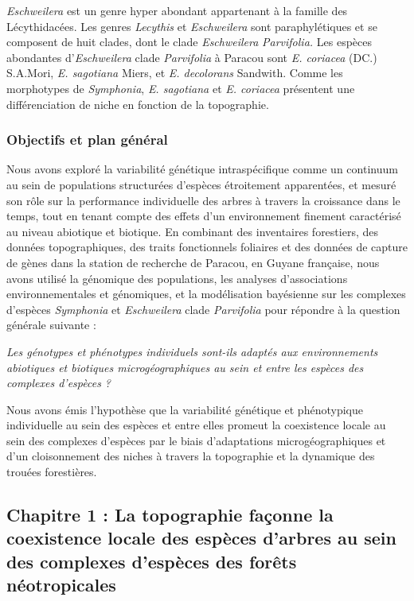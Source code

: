 \documentclass[12pt,twoside,a4paper, a]{article}
\begin{document}
\emph{Eschweilera} est un genre hyper abondant appartenant à la famille des Lécythidacées. Les genres \emph{Lecythis} et \emph{Eschweilera} sont paraphylétiques et se composent de huit clades, dont le clade \emph{Eschweilera} \emph{Parvifolia.} Les espèces abondantes d'\emph{Eschweilera} clade \emph{Parvifolia} à Paracou sont \emph{E. coriacea} (DC.) S.A.Mori, \emph{E. sagotiana} Miers, et \emph{E. decolorans} Sandwith. Comme les morphotypes de \emph{Symphonia}, \emph{E. sagotiana} et \emph{E. coriacea} présentent une différenciation de niche en fonction de la topographie.

\hypertarget{objectifs-et-plan-guxe9nuxe9ral}{%
\subsubsection{Objectifs et plan général}\label{objectifs-et-plan-guxe9nuxe9ral}}

Nous avons exploré la variabilité génétique intraspécifique comme un continuum au sein de populations structurées d'espèces étroitement apparentées, et mesuré son rôle sur la performance individuelle des arbres à travers la croissance dans le temps, tout en tenant compte des effets d'un environnement finement caractérisé au niveau abiotique et biotique. En combinant des inventaires forestiers, des données topographiques, des traits fonctionnels foliaires et des données de capture de gènes dans la station de recherche de Paracou, en Guyane française, nous avons utilisé la génomique des populations, les analyses d'associations environnementales et génomiques, et la modélisation bayésienne sur les complexes d'espèces \emph{Symphonia} et \emph{Eschweilera} clade \emph{Parvifolia} pour répondre à la question générale suivante :

\emph{Les génotypes et phénotypes individuels sont-ils adaptés aux environnements abiotiques et biotiques microgéographiques au sein et entre les espèces des complexes d'espèces ?}

Nous avons émis l'hypothèse que la variabilité génétique et phénotypique individuelle au sein des espèces et entre elles promeut la coexistence locale au sein des complexes d'espèces par le biais d'adaptations microgéographiques et d'un cloisonnement des niches à travers la topographie et la dynamique des trouées forestières.

\hypertarget{chapitre-1-la-topographie-fauxe7onne-la-coexistence-locale-des-espuxe8ces-darbres-au-sein-des-complexes-despuxe8ces-des-foruxeats-nuxe9otropicales}{%
\subsection{Chapitre 1 : La topographie façonne la coexistence locale des espèces d'arbres au sein des complexes d'espèces des forêts néotropicales}\label{chapitre-1-la-topographie-fauxe7onne-la-coexistence-locale-des-espuxe8ces-darbres-au-sein-des-complexes-despuxe8ces-des-foruxeats-nuxe9otropicales}}
\end{document}
